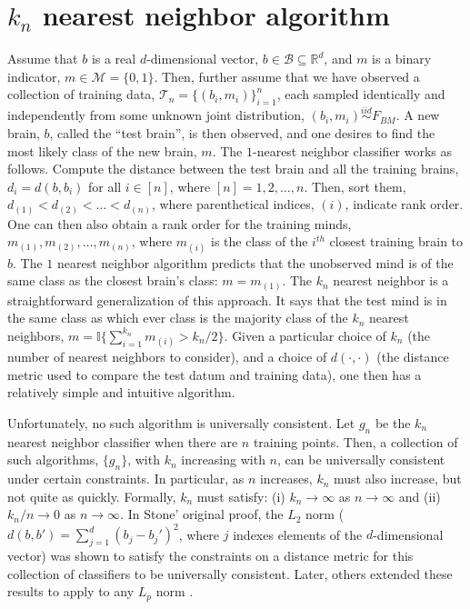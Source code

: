 \documentclass{article}
\newcommand{\conv}{\rightarrow}
\newcommand{\II}{\mathbb{I}}           %
\newcommand{\Real}{\mathbb{R}}           %
\providecommand{\mc}[1]{\mathcal{#1}}
\begin{document}
\appendix
\section{$k_n$ nearest neighbor algorithm} %
\label{app:knn}


Assume that $b$ is a real $d$-dimensional vector, $b \in \mc{B} \subseteq \Real^d$, and $m$ is a binary indicator, $m \in \mc{M} = \{0,1\}$.  Then, further assume that we have observed a collection of training data, $\mc{T}_n =\{(b_i,m_i)\}_{i=1}^n$, each sampled identically and independently from some unknown joint distribution, $(b_i,m_i)\overset{iid}{\sim} F_{BM}$.  A new brain, $b$, called the ``test brain'', is then observed, and one desires to find the most likely class of the new brain, $m$.  The $1$-nearest neighbor classifier works as follows.  Compute the distance between the test brain and all the training brains, $d_i=d(b,b_i)$ for all $i \in [n]$, where $[n]=1,2,\ldots, n$.  Then, sort them, $d_{(1)} < d_{(2)} < \ldots < d_{(n)}$, where parenthetical indices, $(i)$, indicate rank order.  One can then also obtain a rank order for the training minds, $m_{(1)}, m_{(2)}, \ldots, m_{(n)}$, where $m_{(i)}$ is the class of the $i^{th}$ closest training brain to $b$.  The $1$ nearest neighbor algorithm predicts that the unobserved mind is of the same class as the closest brain's class: $m=m_{(1)}$.  The $k_n$ nearest neighbor is a straightforward generalization of this approach.  It says that the test mind is in the same class as which ever class is the majority class of the $k_n$ nearest neighbors, $m=\II\{\sum_{i=1}^{k_n} m_{(i)} > k_n/2\}$.  Given a particular choice of $k_n$ (the number of nearest neighbors to consider), and a choice of $d(\cdot,\cdot)$ (the distance metric used to compare the test datum and training data), one then has a relatively simple and intuitive algorithm.  

Unfortunately, no such algorithm is universally consistent.  Let $g_n$ be the $k_n$ nearest neighbor classifier when there are $n$ training points.  Then, a collection of such algorithms, $\{g_n\}$,  with $k_n$ increasing with $n$, can be universally consistent under certain constraints. In particular, as $n$ increases, $k_n$ must also increase, but not quite as quickly.  Formally, $k_n$ must satisfy: (i) $k_n \conv \infty$ as $n \conv \infty$ and (ii) $k_n/n \conv 0$ as $n\conv\infty$. In Stone' original proof, the $L_2$ norm ($d(b,b')=\sum_{j=1}^d (b_j-b_j')^2$, where $j$ indexes elements of the $d$-dimensional vector) was shown to satisfy the constraints on a distance metric for this collection of classifiers to be universally consistent.  Later, others extended these results to apply to any $L_p$ norm \cite{DGL96}.
\end{document}
